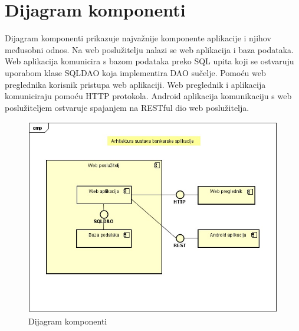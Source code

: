 		\section{Dijagram komponenti}
		
			Dijagram komponenti prikazuje najvažnije komponente aplikacije i njihov međusobni odnos. Na web poslužitelju nalazi se web aplikacija i baza podataka. Web aplikacija komunicira s bazom podataka preko SQL upita koji se ostvaruju uporabom klase SQLDAO koja implementira DAO sučelje. Pomoću web preglednika korisnik pristupa web aplikaciji. Web preglednik i aplikacija komuniciraju pomoću HTTP protokola. Android aplikacija komunikaciju s web poslužiteljem ostvaruje spajanjem na RESTful dio web poslužitelja.
		
			 \begin{figure}[H]
			 	\includegraphics[scale=0.65]{Slike/DijagramKomponenti.jpg}
			 	\centering
			 	\caption{Dijagram komponenti}
			 	\label{fig:dijagram}
			 \end{figure}